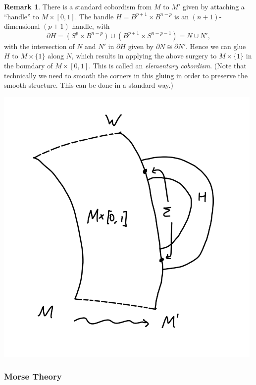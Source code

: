 \documentclass{article}
\theoremstyle{definition}
\newtheorem*{remark}{Remark}
\begin{document}
\begin{remark}
    There is a standard cobordism from $M$ to $M'$ given by attaching a
    ``handle'' to $M\times[0,1]$. The handle $H=B^{p+1}\times B^{n-p}$ is an
    $(n+1)$-dimensional $(p+1)$-handle, with
    \begin{equation*}
        \partial H
            = (S^p\times B^{n-p})\cup(B^{p+1}\times S^{n-p-1})
            = N\cup N',
    \end{equation*}
    with the intersection of $N$ and $N'$ in $\partial H$ given by
    $\partial N\cong\partial N'$. Hence we can glue $H$ to $M\times\{1\}$ along
    $N$, which results in applying the above surgery to $M\times\{1\}$ in the
    boundary of $M\times[0,1]$. This is called an \emph{elementary cobordism}.
    (Note that technically we need to smooth the corners in this gluing in order
    to preserve the smooth structure. This can be done in a standard way.)
    \begin{center}
        \includegraphics[scale=0.5]{manifolds_surgery}
    \end{center}
\end{remark}

\subsubsection*{Morse Theory}
\end{document}
